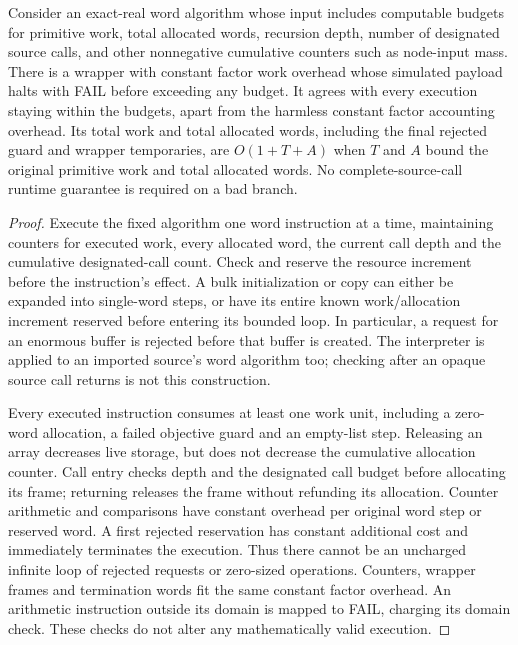 \begin{lemma}
\label{lem:op3-primitive-execution-cap}
Consider an exact-real word algorithm whose input includes computable
budgets for primitive work, total allocated words, recursion depth,
number of designated source calls, and other nonnegative cumulative
counters such as node-input mass. There is a wrapper with constant
factor work overhead whose simulated payload halts with \textnormal{FAIL}
before exceeding any budget. It agrees with every execution staying within the budgets,
apart from the harmless constant factor accounting overhead. Its total
work and total allocated words, including the final rejected guard and
wrapper temporaries, are $O(1+T+A)$ when $T$ and
$A$ bound the original primitive work and total allocated words.
No complete-source-call runtime guarantee is required on a bad branch.
\end{lemma}
\begin{proof}
Execute the fixed algorithm one word instruction at a time, maintaining
counters for executed work, every allocated word, the current call depth
and the cumulative designated-call count. Check and reserve the resource
increment before the instruction's effect. A bulk initialization or copy
can either be expanded into single-word steps, or have its entire known
work/allocation increment reserved before entering its bounded loop.
In particular, a request for an enormous buffer is rejected before that
buffer is created. The interpreter is applied to an imported source's
word algorithm too; checking after an opaque source call returns is not
this construction.

Every executed instruction consumes at least one work unit, including a
zero-word allocation, a failed objective guard and an empty-list step.
Releasing an array decreases live storage, but does not decrease the
cumulative allocation counter. Call entry checks depth and the designated
call budget before allocating its frame; returning releases the frame
without refunding its allocation. Counter arithmetic and comparisons
have constant overhead per original word step or reserved word.
A first rejected reservation has constant additional cost and immediately
terminates the execution. Thus there cannot be an uncharged infinite loop
of rejected requests or zero-sized operations. Counters, wrapper frames
and termination words fit the same constant factor overhead.
An arithmetic instruction outside its domain is mapped to
\textnormal{FAIL}, charging its domain check. These checks do not alter
any mathematically valid execution.
\end{proof}

